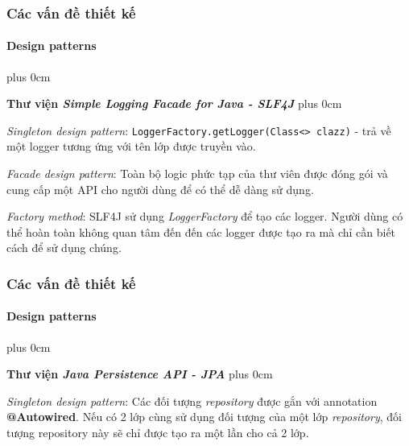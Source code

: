 \documentclass[11pt]{beamer}
\renewcommand{\raggedright}{\leftskip=0pt \rightskip=0pt plus 0cm}
\let\olditemize=\itemize
\renewenvironment{itemize}{\olditemize\raggedright}{\endlist}
\begin{document}
\begin{frame}[plain]
	\frametitle{Các vấn đề thiết kế}
	\framesubtitle{Design patterns}
	\begin{itemize}
		\item \textbf{Thư viện \textit{Simple Logging Facade for Java - SLF4J}}
		\begin{itemize}
			\item \textit{Singleton design pattern}: {\tt LoggerFactory.getLogger(Class<> clazz)} - trả về một logger tương ứng với tên lớp được truyền vào. \\[5pt]
			\item \textit{Facade design pattern}: Toàn bộ logic phức tạp của thư viên được đóng gói và cung cấp một API cho người dùng để có thể dễ dàng sử dụng. \\[5pt]
			\item \textit{Factory method}: SLF4J sử dụng \textit{LoggerFactory} để tạo các logger. Người dùng có thể hoàn toàn không quan tâm đến đến các logger được tạo ra mà chỉ cần biết cách để sử dụng chúng. 
		\end{itemize}
	\end{itemize}
\end{frame}
\begin{frame}[plain]
	\frametitle{Các vấn đề thiết kế}
	\framesubtitle{Design patterns}
	\begin{itemize}
		\item \textbf{Thư viện \textit{Java Persistence API - JPA}}
		\begin{itemize}
			\item \textit{Singleton design pattern}: Các đối tượng \textit{repository} được gắn với annotation \textbf{@Autowired}. Nếu có 2 lớp cùng sử dụng đối tượng của một lớp \textit{repository}, đối tượng repository này sẽ chỉ được tạo ra một lần cho cả 2 lớp. 
		\end{itemize}
	\end{itemize}
\end{frame}
\end{document}
